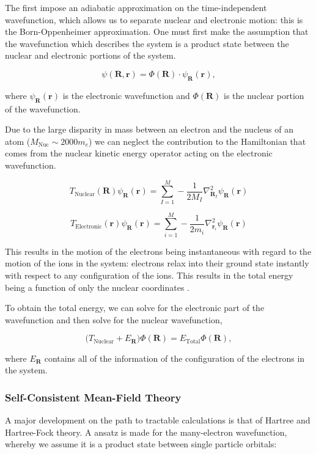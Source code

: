 \documentclass[a4paper,11pt]{article}
\numberwithin{equation}{chapter}
\numberwithin{listing}{chapter}
\begin{document}
The first impose an adiabatic approximation on the time-independent wavefunction, which allows us to separate
nuclear and electronic motion: this is the Born-Oppenheimer approximation. One must first make the
assumption that the wavefunction which describes the system is a product state between the nuclear
and electronic portions of the system.

\[ \psi(\mathbf{R}, \mathbf{r}) = \Phi(\mathbf{R}) \cdot \psi_{\mathbf{R}}(\mathbf{r}), \]

where \(\psi_{\mathbf{R}}(\mathbf{r})\) is the electronic wavefunction and \(\Phi(\mathbf{R})\) is
the nuclear portion of the wavefunction.

Due to the large disparity in mass between an electron and the nucleus of an atom (\(M_\text{Nuc} \sim
2000 m_e\)) we can neglect the contribution to the Hamiltonian that comes from the nuclear
kinetic energy operator acting on the electronic wavefunction.

\[T_{\text{Nuclear}}(\mathbf{R}) \psi_{\mathbf{R}}(\mathbf{r}) = \sum_{I =
1}^{M} - \frac{1}{2M_{I}} \nabla^{2}_{\mathbf{R}_{I}} \psi_{\mathbf{R}}(\mathbf{r})\]


\[T_{\text{Electronic}}(\mathbf{r}) \psi_{\mathbf{R}}(\mathbf{r}) = \sum_{i =
1}^{M} - \frac{1}{2m_{i}} \nabla^{2}_{\mathbf{r}_{i}}
\psi_{\mathbf{R}}(\mathbf{r}) \]

This results in the motion of the electrons being instantaneous with regard to the
motion of the ions in the system: electrons relax into their ground state instantly with
respect to any configuration of the ions. This results in the total energy being a function of
only the nuclear coordinates \cite{Finnis1997}. 

To obtain the total energy, we can solve for the electronic part of the wavefunction and then
solve for the nuclear wavefunction,

\[ \Big( T_{\text{Nuclear}} + E_{\mathbf{R}} \Big) \Phi(\mathbf{R}) = E_{\text{Total}} \Phi(\mathbf{R}),\]

where \(E_{\mathbf{R}}\) contains all of the information of the configuration of the electrons in
the system. 


\subsubsection{Self-Consistent Mean-Field Theory}
\label{sec:org089ffcc}

A major development on the path to tractable calculations is that of Hartree and Hartree-Fock
theory. A ansatz is made for the many-electron wavefunction, whereby we assume it is a product
state between single particle orbitals:
\end{document}
